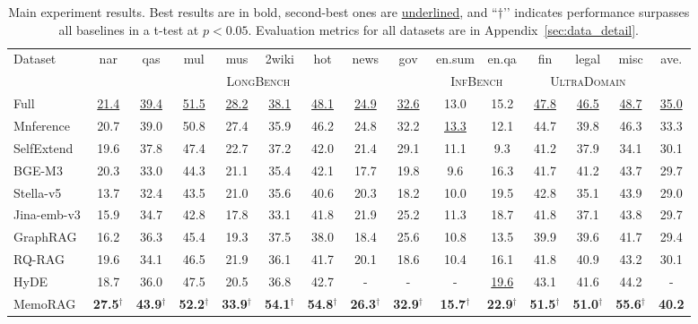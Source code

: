 \documentclass[sigconf]{acmart}
\begin{document}
\begin{table}[t]
    \centering
    \small
    \caption{Main experiment results. Best results are in bold, second-best ones are \underline{underlined}, and ``$\dagger$’’ indicates performance surpasses all baselines in a t-test at $p<0.05$. Evaluation metrics for all datasets are in Appendix~\ref{sec:data_detail}.}    
\begin{tabular}{lccccccccccccc|c}
\toprule
Dataset  & nar & qas & mul & mus & 2wiki & hot & news & gov & en.sum & en.qa & fin & legal  & misc & ave.\\

& \multicolumn{8}{c}{\textsc{LongBench}} & \multicolumn{2}{c}{\textsc{InfBench}}& \multicolumn{3}{c}{\textsc{UltraDomain}}\\
\midrule
Full  & \underline{21.4} & \underline{39.4} & \underline{51.5} & \underline{28.2} & \underline{38.1} & \underline{48.1} & \underline{24.9} &\underline{32.6} &   13.0 & 15.2 & \underline{47.8} & \underline{46.5} & \underline{48.7} &  \underline{35.0}\\
Mnference  & 20.7 & 39.0 & 50.8 & 27.4 & 35.9 & 46.2 & 24.8 & 32.2 & \underline{13.3} & 12.1 & 44.7 & 39.8 & 46.3&33.3\\
SelfExtend & 19.6 & 37.8 & 47.4 & 22.7 & 37.2 & 42.0 & 21.4 & 29.1 & 11.1 & 9.3 & 41.2 & 37.9 & 34.1 & 30.1\\
\midrule
BGE-M3 & 20.3 & 33.0 & 44.3 & 21.1 & 35.4 & 42.1 &  17.7 &  19.8 & 9.6 & 16.3 & 41.7 & 41.2 & 43.7 & 29.7\\
Stella-v5 & 13.7 & 32.4 &43.5 & 21.0 & 35.6 & 40.6 & 20.3 & 18.2 & 10.0 & 19.5  & 42.8 & 35.1 & 43.9 & 29.0\\

Jina-emb-v3 & 15.9 & 34.7 & 42.8 & 17.8 & 33.1 & 41.8 & 21.9 & 25.2 & 11.3& 18.7 & 41.8 & 37.1 & 43.8 & 29.7\\
\midrule
GraphRAG & 16.2 & 36.3 & 45.4 & 19.3 & 37.5 & 38.0 & 18.4 & 25.6 & 10.8 & 13.5 & 39.9 & 39.6 &41.7 & 29.4\\

RQ-RAG & 19.6 &34.1&46.5&21.9&36.1&41.7&20.1&18.6&10.4&16.1 & 41.8&40.9&43.2 & 30.1 \\
HyDE & 18.7 & 36.0 & 47.5 & 20.5 & 36.8 & 42.7 & - & - & - & \underline{19.6} & 43.1 & 41.6 & 44.2 & -\\
\midrule
MemoRAG &\textbf{27.5}$^\dagger$ & \textbf{43.9}$^\dagger$& \textbf{52.2}$^\dagger$& \textbf{33.9}$^\dagger$&\textbf{54.1}$^\dagger$& \textbf{54.8}$^\dagger$ & \textbf{26.3}$^\dagger$&\textbf{32.9}$^\dagger$  &   \textbf{15.7}$^\dagger$ & \textbf{22.9}$^\dagger$ & \textbf{51.5}$^\dagger$& \textbf{51.0}$^\dagger$& \textbf{55.6}$^\dagger$ & \textbf{40.2} \\
\bottomrule
\end{tabular}
\label{tab:exp}
\end{table}
\end{document}
